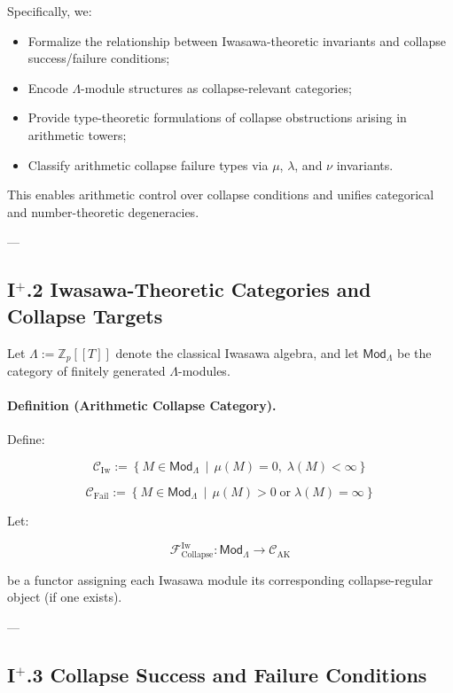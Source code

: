 \documentclass[11pt]{article}
\begin{document}
Specifically, we:
\begin{itemize}
    \item Formalize the relationship between Iwasawa-theoretic invariants and collapse success/failure conditions;
    \item Encode $\Lambda$-module structures as collapse-relevant categories;
    \item Provide type-theoretic formulations of collapse obstructions arising in arithmetic towers;
    \item Classify arithmetic collapse failure types via $\mu$, $\lambda$, and $\nu$ invariants.
\end{itemize}

This enables arithmetic control over collapse conditions and unifies categorical and number-theoretic degeneracies.

---

\subsection*{I$^{+}$.2 Iwasawa-Theoretic Categories and Collapse Targets}

Let $\Lambda := \mathbb{Z}_p[[T]]$ denote the classical Iwasawa algebra, and let $\mathsf{Mod}_\Lambda$ be the category of finitely generated $\Lambda$-modules.

\paragraph{Definition (Arithmetic Collapse Category).}

Define:

\[
\mathcal{C}_{\mathrm{Iw}} := \left\{ M \in \mathsf{Mod}_\Lambda \,\middle|\, \mu(M) = 0,\; \lambda(M) < \infty \right\}
\]

\[
\mathcal{C}_{\mathrm{Fail}} := \left\{ M \in \mathsf{Mod}_\Lambda \,\middle|\, \mu(M) > 0 \;\text{or}\; \lambda(M) = \infty \right\}
\]

Let:

\[
\mathcal{F}_{\mathrm{Collapse}}^{\mathrm{Iw}} : \mathsf{Mod}_\Lambda \to \mathcal{C}_{\mathrm{AK}}
\]

be a functor assigning each Iwasawa module its corresponding collapse-regular object (if one exists).

---

\subsection*{I$^{+}$.3 Collapse Success and Failure Conditions}
\end{document}

